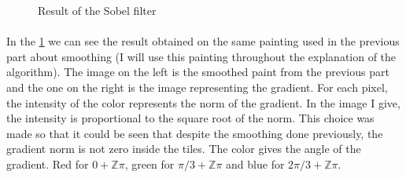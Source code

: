\documentclass[11pt]{article}
\newcommand{\Z}{\mathbb{Z}}
\begin{document}
	\begin{figure}[h]
		\centering
		\vspace{-4mm}
		\caption{Result of the Sobel filter}
		\label{im:sob}
	\end{figure}
	\vspace{-2mm}

	\paragraph{}
	In the \figurename \ref{im:sob} we can see the result obtained on the same painting used in the previous part about smoothing (I will use this painting throughout the explanation of the algorithm). The image on the left is the smoothed paint from the previous part and the one on the right is the image representing the gradient. For each pixel, the intensity of the color represents the norm of the gradient. In the image I give, the intensity is proportional to the square root of the norm. This choice was made so that it could be seen that despite the smoothing done previously, the gradient norm is not zero inside the tiles. The color gives the angle of the gradient. Red for $0+\Z \pi$, green for $\pi / 3 + \Z \pi$ and blue for $2\pi / 3 + \Z \pi$.
	
\end{document}
